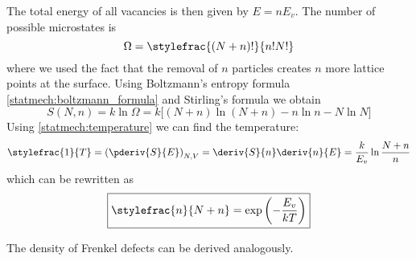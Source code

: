     The total energy of all vacancies is then given by $E = nE_v$. The number of possible microstates is
    \begin{equation}
    	\Omega = \stylefrac{(N+n)!}{n!N!}
	\end{equation}
	where we used the fact that the removal of $n$ particles creates $n$ more lattice points at the surface. Using Boltzmann's entropy formula \ref{statmech:boltzmann_formula} and Stirling's formula we obtain
    \begin{equation}
    	S(N, n) = k\ln\Omega = k\big[(N+n)\ln(N+n) -n\ln n - N\ln N \big]
    \end{equation}
    Using \ref{statmech:temperature} we can find the temperature:
    \begin{equation}
    	\stylefrac{1}{T} = \left(\pderiv{S}{E}\right)_{N, V} = \deriv{S}{n}\deriv{n}{E} = \frac{k}{E_v}\ln\frac{N+n}{n}
    \end{equation}
    which can be rewritten as
    \begin{equation}
    	\boxed{\stylefrac{n}{N + n} = \exp\left(-\frac{E_v}{kT}\right)}
    \end{equation}
    
    The density of Frenkel defects can be derived analogously.
